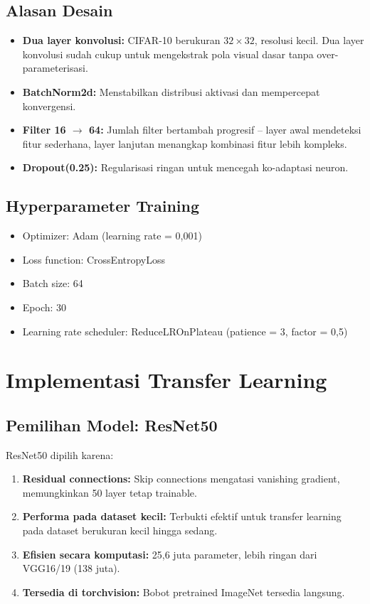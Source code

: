 \documentclass[conference]{IEEEtran}
\begin{document}
\subsection{Alasan Desain}
\begin{itemize}
	\item \textbf{Dua layer konvolusi:} CIFAR-10 berukuran $32 \times 32$, resolusi kecil. Dua layer konvolusi sudah cukup untuk mengekstrak pola visual dasar tanpa over-parameterisasi.
	\item \textbf{BatchNorm2d:} Menstabilkan distribusi aktivasi dan mempercepat konvergensi.
	\item \textbf{Filter 16 $\rightarrow$ 64:} Jumlah filter bertambah progresif -- layer awal mendeteksi fitur sederhana, layer lanjutan menangkap kombinasi fitur lebih kompleks.
	\item \textbf{Dropout(0.25):} Regularisasi ringan untuk mencegah ko-adaptasi neuron.
\end{itemize}

\subsection{Hyperparameter Training}
\begin{itemize}
	\item Optimizer: Adam (learning rate = 0,001)
	\item Loss function: CrossEntropyLoss
	\item Batch size: 64
	\item Epoch: 30
	\item Learning rate scheduler: ReduceLROnPlateau (patience = 3, factor = 0,5)
\end{itemize}

\section{Implementasi Transfer Learning}
\subsection{Pemilihan Model: ResNet50}
ResNet50 dipilih karena:
\begin{enumerate}
	\item \textbf{Residual connections:} Skip connections mengatasi vanishing gradient, memungkinkan 50 layer tetap trainable.
	\item \textbf{Performa pada dataset kecil:} Terbukti efektif untuk transfer learning pada dataset berukuran kecil hingga sedang.
	\item \textbf{Efisien secara komputasi:} 25,6 juta parameter, lebih ringan dari VGG16/19 (138 juta).
	\item \textbf{Tersedia di torchvision:} Bobot pretrained ImageNet tersedia langsung.
\end{enumerate}
\end{document}

